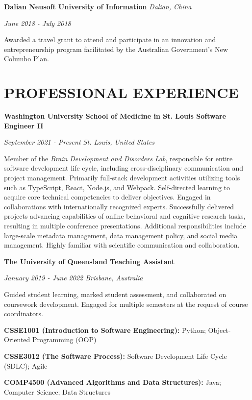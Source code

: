\documentclass{article}
\begin{document}
  \textbf{Dalian Neusoft University of Information} \hfill \textit{Dalian, China}

  \textit{June 2018 - July 2018}

  Awarded a travel grant to attend and participate in an innovation and entrepreneurship program facilitated by the Australian Government's New Columbo Plan.

  \section*{\centering\uppercase{Professional Experience}}

  {\large\textbf{Washington University School of Medicine in St. Louis \hfill Software Engineer II}}

  \textit{September 2021 - Present \hfill St. Louis, United States}

  Member of the \textit{Brain Development and Disorders Lab}, responsible for entire software development life cycle, including cross-disciplinary communication and project management.
  Primarily full-stack development activities utilizing tools such as TypeScript, React, Node.js, and Webpack.
  Self-directed learning to acquire core technical competencies to deliver objectives.
  Engaged in collaborations with internationally recognized experts.
  Successfully delivered projects advancing capabilities of online behavioral and cognitive research tasks, resulting in multiple conference presentations.
  Additional responsibilities include large-scale metadata management, data management policy, and social media management.
  Highly familiar with scientific communication and collaboration.

  \medbreak

  {\large\textbf{The University of Queensland \hfill Teaching Assistant}}

  \textit{January 2019 - June 2022 \hfill Brisbane, Australia}

  Guided student learning, marked student assessment, and collaborated on coursework development. Engaged for multiple semesters at the request of course coordinators.

  \textbf{CSSE1001 (Introduction to Software Engineering):} Python; Object-Oriented Programming (OOP)

  \textbf{CSSE3012 (The Software Process):} Software Development Life Cycle (SDLC); Agile

  \textbf{COMP4500 (Advanced Algorithms and Data Structures):} Java; Computer Science; Data Structures
\end{document}
